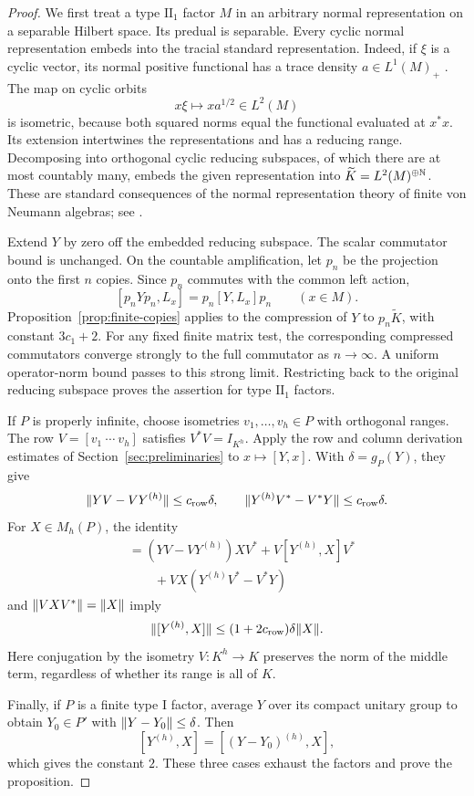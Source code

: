 \begin{proof}
We first treat a type $\mathrm{II}_1$ factor $M$ in an arbitrary normal
representation on a separable Hilbert space.  Its predual is separable.
Every cyclic normal representation embeds into the tracial standard
representation.  Indeed, if $\xi$ is a cyclic vector, its normal positive
functional has a trace density $a\in L^1(M)_+$
\citep[Corollary~5.14 and Remark~5.15]{Hiai2020}.
The map on cyclic orbits
\[
 x\xi\longmapsto xa^{1/2}\in L^2(M)
\]
is isometric, because both squared norms equal the functional evaluated at
$x^*x$.  Its extension intertwines the representations and has a reducing
range.  Decomposing into orthogonal cyclic reducing subspaces, of which
there are at most countably many, embeds the given representation into
$\widetilde K=L^2(M)^{\oplus\mathbb N}$.  These are standard consequences of the normal
representation theory of finite von Neumann algebras; see
\citet{Takesaki1979}.

Extend $Y$ by zero off the embedded reducing subspace.  The scalar
commutator bound is unchanged.  On the countable amplification, let $p_n$
be the projection onto the first $n$ copies.  Since $p_n$ commutes with the
common left action,
\[
 [p_nYp_n,L_x]=p_n[Y,L_x]p_n\qquad(x\in M).
\]
Proposition~\ref{prop:finite-copies} applies to the compression of $Y$ to
$p_n\widetilde K$, with constant $3c_1+2$.  For any fixed finite matrix test, the
corresponding compressed commutators converge strongly to the full
commutator as $n\to\infty$.  A uniform operator-norm bound passes to this
strong limit.  Restricting back to the original reducing subspace proves
the assertion for type $\mathrm{II}_1$ factors.

If $P$ is properly infinite, choose isometries $v_1,\ldots,v_h\in P$ with
orthogonal ranges.  The row $V=[v_1\ \cdots\ v_h]$ satisfies $V^*V=I_{K^h}$.
Apply the row and column derivation estimates of
Section~\ref{sec:preliminaries} to $x\mapsto[Y,x]$.  With
$\delta=g_P(Y)$, they give
\[
 \lVert YV-VY^{(h)}\rVert\le c_{\mathrm{row}}\delta,
 \qquad
 \lVert Y^{(h)}V^*-V^*Y\rVert\le c_{\mathrm{row}}\delta.
\]
For $X\in M_h(P)$, the identity
\begin{align*}
 [Y,VXV^*]
  &=(YV-VY^{(h)})XV^*
    +V[Y^{(h)},X]V^*\\
  &\hspace{2em}+VX(Y^{(h)}V^*-V^*Y)
\end{align*}
and $\lVert VXV^*\rVert=\lVert X\rVert$ imply
\[
 \lVert[Y^{(h)},X]\rVert
 \le(1+2c_{\mathrm{row}})\delta\lVert X\rVert.
\]
Here conjugation by the isometry $V:K^h\to K$ preserves the norm of the
middle term, regardless of whether its range is all of $K$.

Finally, if $P$ is a finite type I factor, average $Y$ over its compact
unitary group to obtain $Y_0\in P'$ with $\lVert Y-Y_0\rVert\le\delta$.
Then
\[
 [Y^{(h)},X]=[(Y-Y_0)^{(h)},X],
\]
which gives the constant $2$.  These three cases exhaust the factors and
prove the proposition.
\end{proof}

